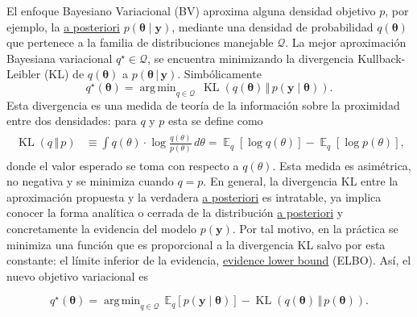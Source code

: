 \documentclass[11pt]{article}
\newcommand{\KL}[2]{\operatorname{KL}\left(#1\,\Vert\,#2\right)}
\newcommand{\E}{\operatorname{\mathbb{E}}}
\DeclareMathOperator*{\argmin}{arg\,min}
\begin{document}


El enfoque Bayesiano Variacional (BV) aproxima alguna densidad objetivo $p$, por ejemplo, la \underline{a posteriori} $p(\boldsymbol{\theta}\mid \boldsymbol{y})$, mediante una densidad de probabilidad $q(\boldsymbol{\theta})$ que pertenece a la familia de distribuciones manejable $\mathcal{Q}$. La mejor aproximación Bayesiana variacional $q^{\star}\in\mathcal{Q}$, se encuentra minimizando la divergencia Kullback-Leibler (KL) de $q(\boldsymbol{\theta})$ a $p(\boldsymbol{\theta} \, | \, \boldsymbol{y})$. Simbólicamente
\begin{equation}
q^{\star}(\boldsymbol{\theta}) = \argmin_{q\in \mathcal{Q}} \, \KL{q(\boldsymbol{\theta})}{p(\boldsymbol{y} \mid \boldsymbol{\theta})}.
\end{equation}
Esta divergencia es una medida de teoría de la información sobre la proximidad entre dos densidades: para $q$ y $p$ esta se define como
\begin{align}
\begin{aligned}
\KL{q}{p} &\equiv \int q(\theta) \cdot \log \frac{q(\theta)}{p(\theta)}\, d\theta = \E_{q}[\log q(\theta)] - \E_{q}[\log p(\theta)],
\end{aligned}
\end{align}
donde el valor esperado se toma con respecto a $q(\theta)$. Esta medida es asimétrica, no negativa y se minimiza cuando $q=p$. En general, la divergencia KL entre la aproximación propuesta y la verdadera \underline{a posteriori} es intratable, ya implica conocer la forma analítica o cerrada de la distribución \underline{a posteriori} y concretamente la evidencia del modelo $p(\boldsymbol{y})$. Por tal motivo, en la práctica se minimiza una función que es proporcional a la divergencia KL salvo por esta constante: el límite inferior de la evidencia, \underline{evidence lower bound} (ELBO). Así, el nuevo objetivo variacional es

\begin{equation}
q^{\star}(\boldsymbol{\theta}) = \argmin_{q\in \mathcal{Q}} \, \mathbb{E}_{q}[p(\boldsymbol{y} \mid \boldsymbol{\theta})] - \KL{q(\boldsymbol{\theta})}{p(\boldsymbol{\theta})}.
\end{equation}
\end{document}
